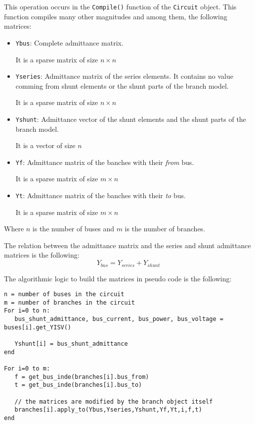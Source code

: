\documentclass[11pt,fleqn]{book} %
\begin{document}
This operation occurs in the \verb|Compile()| function of the \verb|Circuit| object. This function compiles many other magnitudes and among them, the following matrices:

\begin{itemize}
	\item \verb|Ybus|: Complete admittance matrix.
	
	It is a sparse matrix of size $n \times n$
	
	\item \verb|Yseries|: Admittance matrix of the series elements. It contains no value comming from shunt elements or the shunt parts of the branch model.
	
	It is a sparse matrix of size $n \times n$
	
	\item \verb|Yshunt|: Admittance vector of the shunt elements and the shunt parts of the branch model. 
	
	It is a vector of size $n$
	
	\item \verb|Yf|: Admittance matrix of the banches with their \textit{from} bus.
	
	It is a sparse matrix of size $m \times n$
	 
	\item \verb|Yt|: Admittance matrix of the banches with their \textit{to} bus.
	
	It is a sparse matrix of size $m \times n$\newline
\end{itemize}

Where $n$ is the number of buses and $m$ is the number of branches.

The relation between the admittance matrix and the series and shunt admittance matrices is the following:
\begin{equation}
Y_{bus} = Y_{series} + Y_{shunt}
\end{equation}

The algorithmic logic to build the matrices in pseudo code is the following:

\begin{verbatim}
n = number of buses in the circuit
m = number of branches in the circuit
For i=0 to n:
   bus_shunt_admittance, bus_current, bus_power, bus_voltage = buses[i].get_YISV()
   
   Yshunt[i] = bus_shunt_admittance
end

For i=0 to m:
   f = get_bus_inde(branches[i].bus_from)
   t = get_bus_inde(branches[i].bus_to)
   
   // the matrices are modified by the branch object itself
   branches[i].apply_to(Ybus,Yseries,Yshunt,Yf,Yt,i,f,t)
end
	
\end{verbatim}
\end{document}
